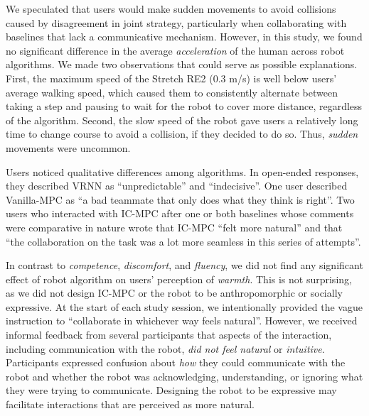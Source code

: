 We speculated that users would make sudden movements to avoid collisions caused by disagreement in joint strategy, particularly when collaborating with baselines that lack a communicative mechanism. However, in this study, we found no significant difference in the average \emph{acceleration} of the human across robot algorithms. We made two observations that could serve as possible explanations. First, the maximum speed of the Stretch RE2 (0.3 m/s) is well below users' average walking speed, which caused them to consistently alternate between taking a step and pausing to wait for the robot to cover more distance, regardless of the algorithm. Second, the slow speed of the robot gave users a relatively long time to change course to avoid a collision, if they decided to do so. Thus, \emph{sudden} movements were uncommon.

Users noticed qualitative differences among algorithms. In open-ended responses, they described VRNN as ``unpredictable'' and ``indecisive''.
One user described Vanilla-MPC as ``a bad teammate that only does what they think is right''.
Two users who interacted with IC-MPC after one or both baselines whose comments were comparative in nature wrote that IC-MPC ``felt more natural'' and that ``the collaboration on the task was a lot more seamless in this series of attempts''.

In contrast to \emph{competence}, \emph{discomfort}, and \emph{fluency}, we did not find any significant effect of robot algorithm on users' perception of \emph{warmth}.
This is not surprising, as we did not design IC-MPC or the robot to be anthropomorphic or socially expressive.
At the start of each study session, we intentionally provided the vague instruction to ``collaborate in whichever way feels natural''.
However, we received informal feedback from several participants that aspects of the interaction, including communication with the robot, \emph{did not feel natural} or \emph{intuitive}.
Participants expressed confusion about \emph{how} they could communicate with the robot and whether the robot was acknowledging, understanding, or ignoring what they were trying to communicate.
Designing the robot to be expressive may facilitate interactions that are perceived as more natural.
